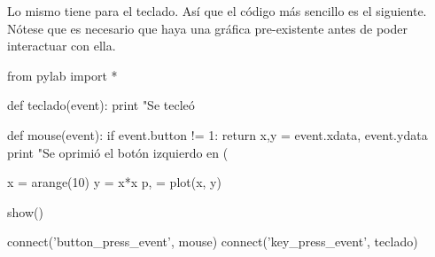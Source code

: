 Lo mismo tiene para el teclado. Así que el código más sencillo es el siguiente. Nótese que es necesario que haya una gráfica pre-existente antes de poder interactuar con ella.
\begin{python}
from pylab import *

def teclado(event):
  print "Se tecleó %

def mouse(event):	
  if event.button != 1: 
    return
  x,y = event.xdata, event.ydata
  print "Se oprimió el botón izquierdo en (%

x = arange(10)
y = x*x
p, = plot(x, y)

show()

connect('button_press_event', mouse)
connect('key_press_event', teclado)
\end{python}